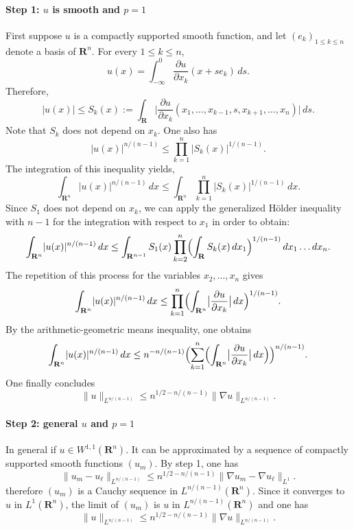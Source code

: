 \documentclass[12pt]{article}
\begin{document}
\paragraph{Step 1: $u$ is smooth and $p=1$}
First suppose $u$ is a compactly supported smooth function, and let $(e_k)_{1 \le k \le n}$ denote a basis of $\mathbf{R}^n$. For every $1 \le k \le n$,
\[
  u(x)=\int_{-\infty}^0 \frac{\partial u}{\partial x_k}(x+se_k)\,ds.
\]
Therefore,
\[
  \lvert u(x)\rvert \le S_k(x):=\int_{\mathbf{R}} \bigl\lvert\frac{\partial u}{\partial x_k}(x_1,\dots,x_{k-1},s,x_{k+1},\dots,x_n)\bigr\rvert\,ds.
\]
Note that $S_k$ does not depend on $x_k$.
One also has
\[
  \lvert u(x)\rvert^{n/(n-1)}\le \prod_{k=1}^n \lvert S_k(x)\rvert^{1/(n-1)}.
\]
The integration of this inequality yields,
\[
  \int_{\mathbf{R}^n} \vert u(x)\vert^{n/(n-1)}\,dx\le \int_{\mathbf{R}^n}\prod_{k=1}^n \lvert S_k(x)\rvert^{1/(n-1)}\,dx.
\]
Since $S_1$ does not depend on $x_k$, we can apply the generalized H\"older inequality with $n-1$ for the integration with respect to $x_1$ in order to obtain:
\[
  \int_{\mathbf{R}^n} \lvert u(x)\rvert^{n/(n-1)}\,dx\le \int_{\mathbf{R}^{n-1}} S_1(x)\prod_{k=2}^n \Bigl(\int_{\mathbf{R}} S_k(x)\,dx_1\Bigr)^{1/(n-1)}\,dx_1\dots dx_n.
\]
The repetition of this process for the variables $x_2,\dots,x_n$ gives
\[
  \int_{\mathbf{R}^n} \lvert u(x)\rvert^{n/(n-1)}\,dx\le \prod_{k=1}^n \Bigl(\int_{\mathbf{R}^n} \bigl\lvert \frac{\partial u}{\partial x_k}\bigr\rvert\,dx\Bigr)^{1/(n-1)}.
\]
By the arithmetic-geometric means inequality, one obtains
\[
  \int_{\mathbf{R}^n} \lvert u(x)\rvert^{n/(n-1)}\,dx\le n^ {-n/(n-1)}\Bigl(\sum_{k=1}^n \Bigl(\int_{\mathbf{R}^n} \bigl\lvert \frac{\partial u}{\partial x_k}\bigr\rvert\,dx\Bigr)\Bigr)^{n/(n-1)}.
\]
One finally concludes
\[
  \lVert u \rVert_{L^{n/(n-1)}} \le n^{1/2-n/(n-1)} \lVert \nabla u \rVert_{L^{n/(n-1)}}.
\]

\paragraph{Step 2: general $u$ and $p=1$}
In general if $u \in W^{1,1}(\mathbf{R}^n)$. It can be approximated by a sequence of compactly supported smooth functions $(u_m)$. By step 1, one has
\[
  \lVert u_m-u_\ell \rVert_{L^{n/(n-1)}} \le n^{1/2-n/(n-1)} \lVert \nabla u_m-\nabla u_\ell \rVert_{L^{1}}.
\]
therefore $(u_m)$ is a Cauchy sequence in $L^{n/(n-1)}(\mathbf{R}^n)$. Since it converges to $u$ in $L^{1}(\mathbf{R}^n)$, the limit of $(u_m)$ is $u$ in $L^{n/(n-1)}(\mathbf{R}^n)$ and one has
\[
  \lVert u \rVert_{L^{n/(n-1)}} \le n^{1/2-n/(n-1)} \lVert \nabla u \rVert_{L^{n/(n-1)}}.  
\]
\end{document}
